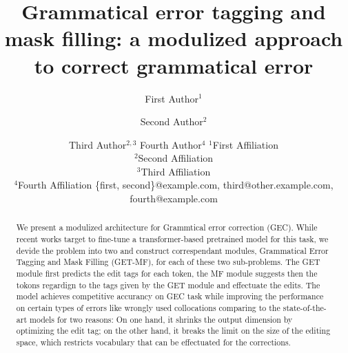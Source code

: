 \documentclass{article}
\title{Grammatical error tagging and mask filling: a modulized approach to correct grammatical error}
\author{
First Author$^1$
\and
Second Author$^2$\and
Third Author$^{2,3}$\And
Fourth Author$^4$
\affiliations
$^1$First Affiliation\\
$^2$Second Affiliation\\
$^3$Third Affiliation\\
$^4$Fourth Affiliation
\emails
\{first, second\}@example.com,
third@other.example.com,
fourth@example.com
}
\begin{document}
\maketitle

\begin{abstract}
We present a modulized architecture for Grammtical error correction (GEC). While recent works target to fine-tune a transformer-based pretrained model for this task, we devide the problem into two and construct correspendant modules, Grammatical Error Tagging and Mask Filling (GET-MF), for each of these two sub-problems. The GET module first predicts the edit tags for each token, the MF module suggests then the tokons regardign to the tags given by the GET module and effectuate the edits. The model achieves competitive accurancy on GEC task while improving the performance on certain types of errors like wrongly used collocations comparing to the state-of-the-art models for two reasons: On one hand, it shrinks the output dimension by optimizing the edit tag; on the other hand, it breaks the limit on the size of the editing space, which restricts vocabulary that can be effectuated for the corrections. 
\end{abstract}




%





\end{document}
